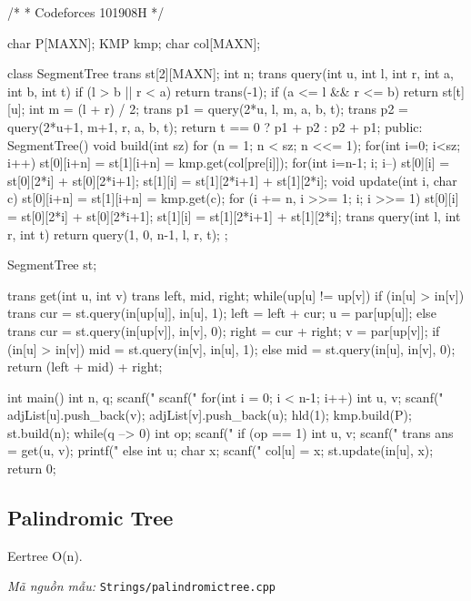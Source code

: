 \documentclass[11pt]{article}
\newcommand{\codepath}[1]{\par\noindent\textit{Mã nguồn mẫu:} \texttt{#1}\par}
\begin{document}
\begin{vncode}
/*
 * Codeforces 101908H
 */

char P[MAXN];
KMP kmp;
char col[MAXN];

class SegmentTree {
	trans st[2][MAXN];
	int n;
	trans query(int u, int l, int r, int a, int b, int t) {
		if (l > b || r < a) return trans(-1);
		if (a <= l && r <= b) return st[t][u];
		int m = (l + r) / 2;
		trans p1 = query(2*u, l, m, a, b, t);
		trans p2 = query(2*u+1, m+1, r, a, b, t);
		return t == 0 ? p1 + p2 : p2 + p1;
	}
public:
	SegmentTree() {}
	void build(int sz) {
		for (n = 1; n < sz; n <<= 1);
		for(int i=0; i<sz; i++) {
			st[0][i+n] = st[1][i+n] = kmp.get(col[pre[i]]);
		}
		for(int i=n-1; i; i--) {
			st[0][i] = st[0][2*i] + st[0][2*i+1];
			st[1][i] = st[1][2*i+1] + st[1][2*i];
		}
	}
	void update(int i, char c) {
		st[0][i+n] = st[1][i+n] = kmp.get(c);
		for (i += n, i >>= 1; i; i >>= 1) {
			st[0][i] = st[0][2*i] + st[0][2*i+1];
			st[1][i] = st[1][2*i+1] + st[1][2*i];
		}
	}
	trans query(int l, int r, int t) {
		return query(1, 0, n-1, l, r, t);
	}
};

SegmentTree st;

trans get(int u, int v) {
	trans left, mid, right;
	while(up[u] != up[v]) {
		if (in[u] > in[v]) {
			trans cur = st.query(in[up[u]], in[u], 1);
			left = left + cur;
			u = par[up[u]];
		}
		else {
			trans cur = st.query(in[up[v]], in[v], 0);
			right = cur + right;
			v = par[up[v]];
		}
	}
	if (in[u] > in[v]) mid = st.query(in[v], in[u], 1);
	else mid = st.query(in[u], in[v], 0);
	return (left + mid) + right;
}

int main() {
	int n, q;
	scanf("%
	scanf(" %
	for(int i = 0; i < n-1; i++) {
		int u, v;
		scanf("%
		adjList[u].push_back(v);
		adjList[v].push_back(u);
	}
	hld(1);
	kmp.build(P);
	st.build(n);
	while(q --> 0) {
		int op;
		scanf("%
		if (op == 1) {
			int u, v;
			scanf("%
			trans ans = get(u, v);
			printf("%
		}
		else {
			int u;
			char x;
			scanf("%
			col[u] = x;
			st.update(in[u], x);
		}
	}
	return 0;
}
\end{vncode}
\endgroup


\subsection{Palindromic Tree}

Eertree O(n).

\codepath{Strings/palindromictree.cpp}
\end{document}
